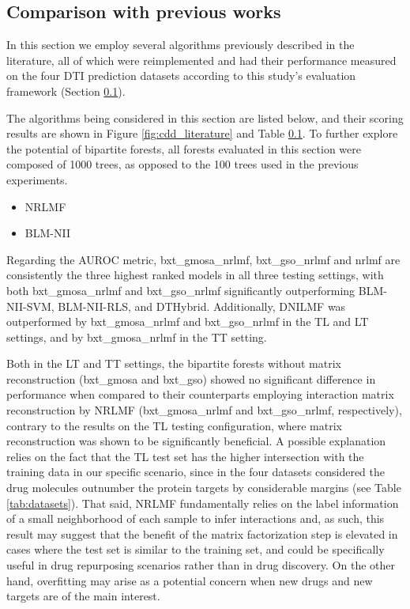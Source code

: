 \subsection{Comparison with previous works}

In this section we employ several algorithms previously described in the literature, all of which were reimplemented and had their performance measured on the four DTI prediction datasets according to this study's evaluation framework (Section \ref{}).

The algorithms being considered in this section are listed below, and their scoring results are shown in Figure \ref{fig:cdd_literature} and Table \ref{}. To further explore the potential of bipartite forests, all forests evaluated in this section were composed of 1000 trees, as opposed to the 100 trees used in the previous experiments.

\begin{itemize}
    \item NRLMF \cite{Liu_2017}
    \item BLM-NII 
\end{itemize}

Regarding the AUROC metric, bxt\_gmosa\_nrlmf, bxt\_gso\_nrlmf and nrlmf are consistently the three highest ranked models in all three testing settings, with both bxt\_gmosa\_nrlmf and bxt\_gso\_nrlmf significantly outperforming BLM-NII-SVM, BLM-NII-RLS, and DTHybrid.
Additionally, DNILMF was outperformed by bxt\_gmosa\_nrlmf and bxt\_gso\_nrlmf in the TL and LT settings, and by bxt\_gmosa\_nrlmf in the TT setting.

Both in the LT and TT settings, the bipartite forests without matrix reconstruction (bxt\_gmosa and bxt\_gso) showed no significant difference in performance when compared to their counterparts employing interaction matrix reconstruction by NRLMF (bxt\_gmosa\_nrlmf and bxt\_gso\_nrlmf, respectively), contrary to the results on the TL testing configuration, where matrix reconstruction was shown to be significantly beneficial.
A possible explanation relies on the fact that the TL test set has the higher intersection with the training data in our specific scenario, since in the four datasets considered the drug molecules outnumber the protein targets by considerable margins (see Table \ref{tab:datasets}).
That said, NRLMF fundamentally relies on the label information of a small neighborhood of each sample to infer interactions and, as such, this result may suggest that the benefit of the matrix factorization step is elevated in cases where the test set is similar to the training set, and could be specifically useful in drug repurposing scenarios rather than in drug discovery. On the other hand, overfitting may arise as a potential concern when new drugs and new targets are of the main interest.

